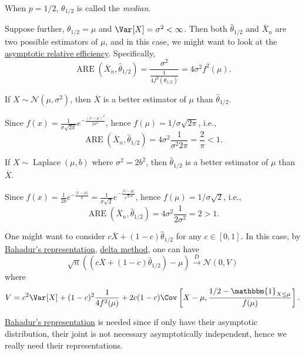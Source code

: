 \begin{definition}[Median]\label{def:median}
	When \(p = 1 / 2\), \(\theta _{1 / 2}\) is called the \emph{median}.
\end{definition}

Suppose further, \(\theta _{1 / 2} = \mu \) and \(\Var_{}[X] = \sigma ^2 < \infty \). Then both \(\hat{\theta} _{1 / 2}\) and \(\overline{X} _n\) are two possible estimators of \(\mu \), and in this case, we might want to look at the \hyperref[def:asymptotic-relative-efficiency]{asymptotic relative efficiency}. Specifically,
\[
	\operatorname{ARE}(\overline{X} _n , \hat{\theta} _{1 / 2})
	= \frac{\sigma ^2}{\frac{1}{4 f^2(\theta _{1 / 2})}}
	= 4 \sigma ^2 f^2(\mu ).
\]

\begin{eg}
	If \(X \sim \mathcal{N} (\mu , \sigma ^2)\), then \(\overline{X} \) is a better estimator of \(\mu \) than \(\hat{\theta} _{1 / 2}\).
\end{eg}
\begin{explanation}
	Since \(f(x) = \frac{1}{\sigma \sqrt{2\pi } } e^{- \frac{(x - \mu )^2}{2 \sigma ^2}}\), hence \(f(\mu ) = 1 / \sigma \sqrt{2\pi } \), i.e.,
	\[
		\operatorname{ARE}(\overline{X} _n, \hat{\theta} _{1 / 2})
		= 4 \sigma ^2 \frac{1}{\sigma ^2 2\pi }
		= \frac{2}{\pi }
		< 1.
	\]
\end{explanation}

\begin{eg}
	If \(X \sim \operatorname{Laplace}(\mu , b) \) where \(\sigma ^2 = 2b^2\), then \(\hat{\theta} _{1 / 2}\) is a better estimator of \(\mu \) than \(\overline{X} \).
\end{eg}
\begin{explanation}
	Since \(f(x) = \frac{1}{2b} e^{- \frac{\vert x - \mu \vert }{b}} = \frac{1}{\sigma \sqrt{2} } e^{- \frac{\vert x - \mu \vert }{\sqrt{2} \sigma }}\), hence \(f(\mu ) = 1 / \sigma \sqrt{2} \), i.e.,
	\[
		\operatorname{ARE}(\overline{X} _n, \hat{\theta} _{1 / 2})
		= 4 \sigma ^2 \frac{1}{2 \sigma ^2}
		= 2 > 1.
	\]
\end{explanation}

One might want to consider \(c \overline{X} + (1 - c)\hat{\theta} _{1 / 2}\) for any \(c \in [0, 1]\). In this case, by \hyperref[thm:Bahadur-representation]{Bahadur's representation}, \hyperref[thm:delta-method]{delta method}, one can have
\[
	\sqrt{n} \left( (c \overline{X} + (1 - c)\hat{\theta} _{1 / 2}) - \mu \right)
	\overset{D}{\to} \mathcal{N} (0, V)
\]
where
\[
	V = c^2 \Var_{}[X] + (1 - c)^2 \frac{1}{4 f^2(\mu )} + 2c(1 - c) \Cov_{}\left[X - \mu , \frac{1 / 2 - \mathbbm{1}_{X \leq \mu } }{f(\mu )}\right].
\]

\begin{remark}
	\hyperref[thm:Bahadur-representation]{Bahadur's representation} is needed since if only have their asymptotic distribution, their joint is not necessary asymptotically independent, hence we really need their representations.
\end{remark}